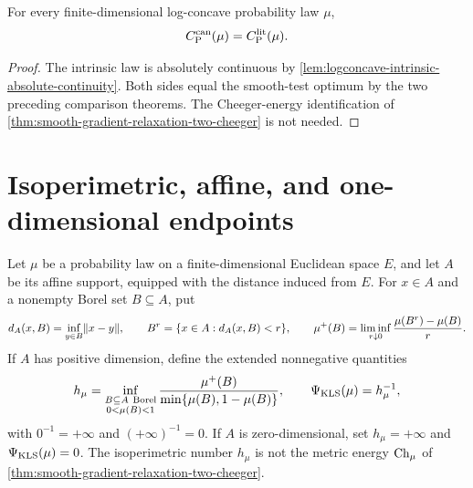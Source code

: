 \begin{theorem}
  \label{thm:selected-literature-constant-equivalence}
  \leanok
  For every finite-dimensional log-concave probability law $\mu$,
  \[
    C_{\mathrm P}^{\mathrm{can}}(\mu)=C_{\mathrm P}^{\mathrm{lit}}(\mu).
  \]
\end{theorem}
\begin{proof}
  \leanok
  The intrinsic law is absolutely continuous by
  \cref{lem:logconcave-intrinsic-absolute-continuity}. Both sides equal the smooth-test
  optimum by the two preceding comparison
  theorems.  The Cheeger-energy identification of
  \cref{thm:smooth-gradient-relaxation-two-cheeger} is not needed.
\end{proof}

\section{Isoperimetric, affine, and one-dimensional endpoints}

\begin{definition}
  \label{def:isoperimetric-cheeger-scale}
  \leanok
  Let $\mu$ be a probability law on a finite-dimensional Euclidean space $E$, and let $A$ be its
  affine support, equipped with the distance induced from $E$.  For $x\in A$ and a nonempty Borel
  set $B\subseteq A$, put
  \[
    d_A(x,B)=\inf_{y\in B}\lVert x-y\rVert,
    \qquad
    B^r=\{x\in A:d_A(x,B)<r\},
    \qquad
    \mu^+(B)=\liminf_{r\downarrow0}\frac{\mu(B^r)-\mu(B)}{r}.
  \]
  If $A$ has positive dimension, define the extended nonnegative quantities
  \[
    h_\mu=\inf_{\substack{B\subseteq A\ \mathrm{Borel}\\0<\mu(B)<1}}
      \frac{\mu^+(B)}{\min\{\mu(B),1-\mu(B)\}},
    \qquad
    \PsiKLS(\mu)=h_\mu^{-1},
  \]
  with $0^{-1}=+\infty$ and $(+\infty)^{-1}=0$.  If $A$ is zero-dimensional, set
  $h_\mu=+\infty$ and $\Psi_{\mathrm{KLS}}(\mu)=0$.  The isoperimetric number $h_\mu$ is not the metric energy
  $\mathrm{Ch}_\mu$ of \cref{thm:smooth-gradient-relaxation-two-cheeger}.
\end{definition}

